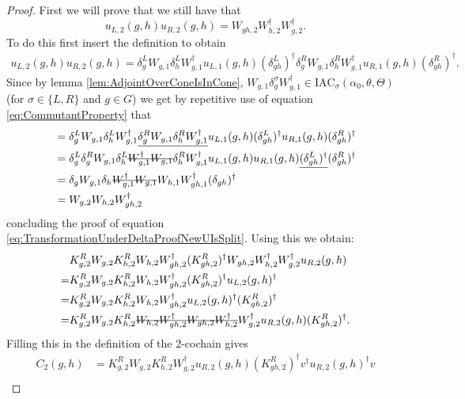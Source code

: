 \documentclass[12pt,a4paper,twoside]{article}
\newcommand{\stkout}[1]{\ifmmode\text{\sout{\ensuremath{#1}}}\else\sout{#1}\fi}
\newcommand{\IAC}{\textrm{IAC}}
\theoremstyle{definition}
\numberwithin{equation}{section}
\begin{document}
\begin{proof}
	First we will prove that we still have that
	\begin{equation}\label{eq:TransformationUnderDeltaProofNewUIsSplit}
		u_{L,2}(g,h)u_{R,2}(g,h)=W_{gh,2}W_{h,2}^\dagger W_{g,2}^\dagger.
	\end{equation}
	To do this first insert the definition to obtain
	\begin{align}
		u_{L,2}(g,h)u_{R,2}(g,h)=\delta_g^L W_{g,1}\delta_h^L W_{g,1}^\dagger u_{L,1}(g,h)(\delta_{gh}^L)^\dagger \delta_g^R W_{g,1}\delta_h^R W_{g,1}^\dagger u_{R,1}(g,h)(\delta_{gh}^R)^\dagger.
	\end{align}
	Since by lemma \ref{lem:AdjointOverConeIsInCone}, $ W_{g,1}\delta_g^\sigma W_{g,1}^\dagger\in\IAC_\sigma(\alpha_0,\theta,\Theta)$ (for $\sigma\in\{L,R\}$ and $g\in G$) we get by repetitive use of equation \eqref{eq:CommutantProperty} that
	\begin{align}
		&=\delta_g^L W_{g,1}\delta_h^L W_{g,1}^\dagger \underline{\delta_g^R W_{g,1}\delta_h^R W_{g,1}^\dagger} u_{L,1}(g,h)(\delta_{gh}^L)^\dagger  u_{R,1}(g,h)(\delta_{gh}^R)^\dagger\\
		&=\delta_g^L \delta_g^R W_{g,1}\delta_h^L \stkout{ W_{g,1}^\dagger W_{g,1}}\delta_h^R W_{g,1}^\dagger u_{L,1}(g,h)  u_{R,1}(g,h)\underline{(\delta_{gh}^L)^\dagger}(\delta_{gh}^R)^\dagger\\
		&=\delta_g W_{g,1}\delta_h \stkout{W_{g,1}^\dagger W_{g,1}} W_{h,1} W_{gh,1}^\dagger(\delta_{gh})^\dagger\\
		&=W_{g,2}W_{h,2}W_{gh,2}^\dagger
	\end{align}
	concluding the proof of equation \eqref{eq:TransformationUnderDeltaProofNewUIsSplit}. Using this we obtain:
	\begin{align}
		&K_{g,2}^RW_{g,2}K_{h,2}^{R}W_{h,2}W_{gh,2}^\dagger(K_{gh,2}^R)^\dagger W_{gh,2}W_{h,2}^\dagger W_{g,2}^\dagger u_{R,2}(g,h)\\
		=&K_{g,2}^RW_{g,2}K_{h,2}^{R}W_{h,2}W_{gh,2}^\dagger(K_{gh,2}^R)^\dagger u_{L,2}(g,h)^\dagger\\
		=&K_{g,2}^RW_{g,2}K_{h,2}^{R}W_{h,2}W_{gh,2}^\dagger u_{L,2}(g,h)^\dagger (K_{gh,2}^R)^\dagger\\
		=&K_{g,2}^RW_{g,2}K_{h,2}^{R}\stkout{W_{h,2}W_{gh,2}^\dagger W_{gh,2}W_{h,2}^\dagger} W_{g,2}^\dagger u_{R,2}(g,h) (K_{gh,2}^R)^\dagger.
	\end{align}
	Filling this in the definition of the 2-cochain gives
	\begin{align}
		C_2(g,h)&=K_{g,2}^RW_{g,2}K_{h,2}^{R}W_{g,2}^\dagger u_{R,2}(g,h) (K_{gh,2}^R)^\dagger v^\dagger u_{R,2}(g,h)^\dagger v\\

\end{align}
\end{proof}
\end{document}

